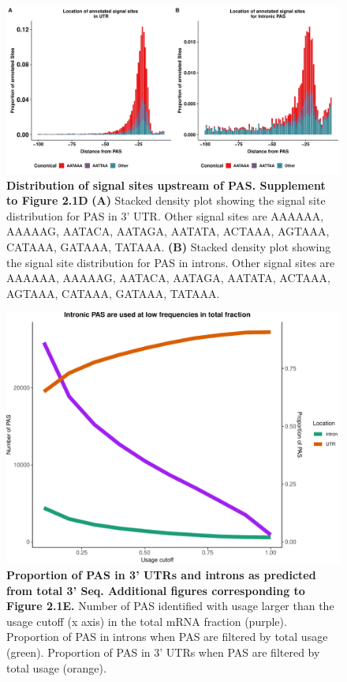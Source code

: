 \begin{figure}[!htb]
\centering \includegraphics[width=5in]{img/ch02/Fig1_figuresupplement2.pdf}
\caption[Distribution of signal sites upstream of PAS. Supplement to Figure 2.1D]{\textbf{Distribution of signal sites upstream of PAS. Supplement to Figure 2.1D} {\bf (A)} Stacked density plot showing the signal site distribution for PAS in 3' UTR. Other signal sites are AAAAAA, AAAAAG, AATACA, AATAGA, AATATA, ACTAAA, AGTAAA, CATAAA, GATAAA, TATAAA. {\bf (B)} Stacked density plot showing the signal site distribution for PAS in introns. Other signal sites are AAAAAA, AAAAAG, AATACA, AATAGA, AATATA, ACTAAA, AGTAAA, CATAAA, GATAAA, TATAAA.}
\label{fig:SS}
\end{figure}
\clearpage

\begin{figure}[!htb]
\centering
\includegraphics[width=5in]{img/ch02/Fig1_figuresupplement3.pdf}
\caption[Proportion of PAS in 3' UTRs and introns as predicted from total 3' Seq. Additional figures corresponding to Figure 2.1E.]{\textbf{Proportion of PAS in 3' UTRs and introns as predicted from total 3' Seq. Additional figures corresponding to Figure 2.1E.} Number of PAS identified with usage larger than the usage cutoff (x axis) in the total mRNA fraction (purple). Proportion of PAS in introns when PAS are filtered by total usage (green). Proportion of PAS in 3' UTRs when PAS are filtered by total usage (orange).}
\label{fig:totaUsage}
\end{figure}
\clearpage

